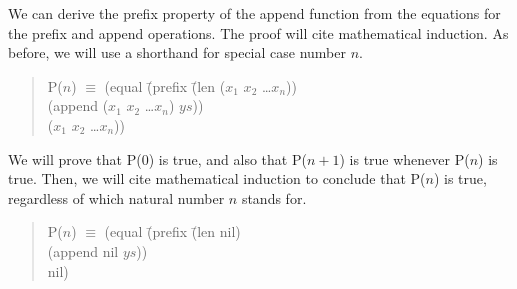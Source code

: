 \begin{comment}
\begin{lstlisting}
(defthmd append-prefix-thm
  (implies (true-listp xs)
           (equal (prefix (len xs) (append xs ys))
                  xs)))
\end{lstlisting}

ACL2 succeeds in proving this theorem on its own, but a little more practice with proof by mathematical induction won't hurt us, so let's do a paper-and-pencil proof ourselves. In our proof we will assume, as usual, that the notation ($x_1$ $x_2$ \dots $x_n$) stands for a list, so we don't need to worry about the hypothesis in the implication. It is automatically satisfied, and we can focus on the conclusion. As before, we will use P($n$) as a shorthand for special case number $n$.
\end{comment}

We can derive the prefix property of the append function from the equations for the prefix and append operations.
The proof will cite mathematical induction.  As before, we will use a shorthand for special case number $n$.


\begin{quote}
\begin{tabbing}
P($n$) $\equiv$ (equal \=(prefix \=(len ($x_1$ $x_2$ \dots $x_n$))          \\
                       \>        \>(append ($x_1$ $x_2$ \dots $x_n$) $ys$)) \\
                       \>($x_1$ $x_2$ \dots $x_n$))                         \\
\end{tabbing}
\end{quote}

We will prove that P(0) is true, and also that P($n+1$) is true whenever P($n$) is true. Then, we will cite mathematical induction to conclude that P($n$) is true, regardless of which natural number $n$ stands for.

\begin{quote}
\begin{tabbing}
P($n$) $\equiv$ (equal \=(prefix \=(len nil)          \\
                       \>        \>(append nil $ys$)) \\
                       \>nil)                         \\
\end{tabbing}
\end{quote}

